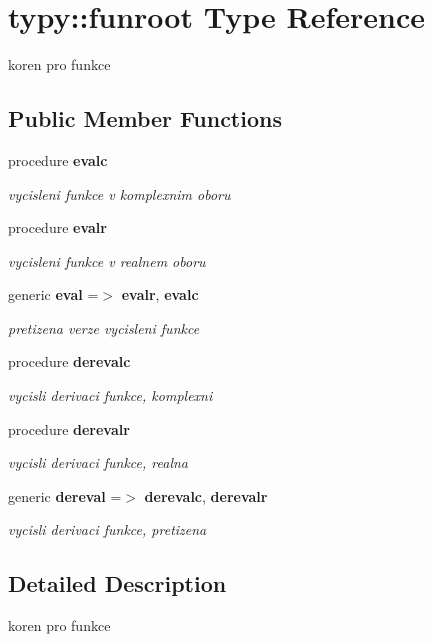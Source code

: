 \section{typy\+:\+:funroot Type Reference}
\label{structtypy_1_1funroot}


koren pro funkce  


\subsection*{Public Member Functions}
\begin{DoxyCompactItemize}
\item 
procedure {\bf evalc}
\begin{DoxyCompactList}\small\item\em vycisleni funkce v komplexnim oboru \end{DoxyCompactList}\item 
procedure {\bf evalr}
\begin{DoxyCompactList}\small\item\em vycisleni funkce v realnem oboru \end{DoxyCompactList}\item 
generic {\bf eval} =$>$ {\bf evalr}, {\bf evalc}
\begin{DoxyCompactList}\small\item\em pretizena verze vycisleni funkce \end{DoxyCompactList}\item 
procedure {\bf derevalc}
\begin{DoxyCompactList}\small\item\em vycisli derivaci funkce, komplexni \end{DoxyCompactList}\item 
procedure {\bf derevalr}
\begin{DoxyCompactList}\small\item\em vycisli derivaci funkce, realna \end{DoxyCompactList}\item 
generic {\bf dereval} =$>$ {\bf derevalc}, {\bf derevalr}
\begin{DoxyCompactList}\small\item\em vycisli derivaci funkce, pretizena \end{DoxyCompactList}\end{DoxyCompactItemize}


\subsection{Detailed Description}
koren pro funkce 

